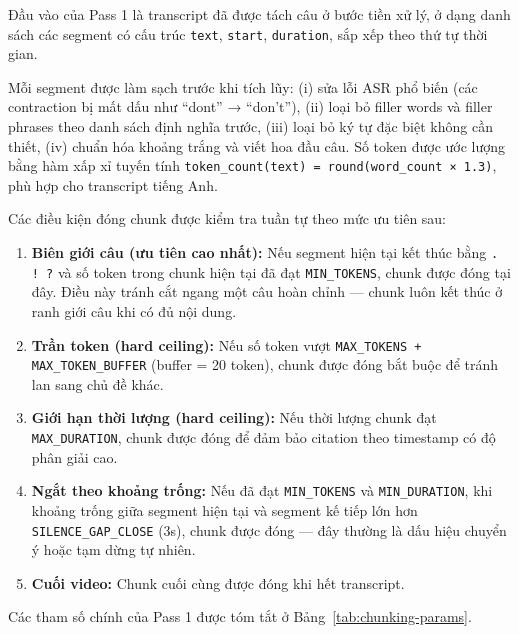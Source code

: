 Đầu vào của Pass 1 là transcript đã được tách câu ở bước tiền xử lý, ở dạng danh sách các segment có cấu trúc \texttt{text}, \texttt{start}, \texttt{duration}, sắp xếp theo thứ tự thời gian.

Mỗi segment được làm sạch trước khi tích lũy: (i) sửa lỗi ASR phổ biến (các contraction bị mất dấu như ``dont'' → ``don't''), (ii) loại bỏ filler words và filler phrases theo danh sách định nghĩa trước, (iii) loại bỏ ký tự đặc biệt không cần thiết, (iv) chuẩn hóa khoảng trắng và viết hoa đầu câu. Số token được ước lượng bằng hàm xấp xỉ tuyến tính \texttt{token\_count(text) = round(word\_count × 1.3)}, phù hợp cho transcript tiếng Anh.

Các điều kiện đóng chunk được kiểm tra tuần tự theo mức ưu tiên sau:

\begin{enumerate}
\item \textbf{Biên giới câu (ưu tiên cao nhất):} Nếu segment hiện tại kết thúc bằng \texttt{. ! ?} và số token trong chunk hiện tại đã đạt \texttt{MIN\_TOKENS}, chunk được đóng tại đây. Điều này tránh cắt ngang một câu hoàn chỉnh — chunk luôn kết thúc ở ranh giới câu khi có đủ nội dung.
\item \textbf{Trần token (hard ceiling):} Nếu số token vượt \texttt{MAX\_TOKENS + MAX\_TOKEN\_BUFFER} (buffer = 20 token), chunk được đóng bắt buộc để tránh lan sang chủ đề khác.
\item \textbf{Giới hạn thời lượng (hard ceiling):} Nếu thời lượng chunk đạt \texttt{MAX\_DURATION}, chunk được đóng để đảm bảo citation theo timestamp có độ phân giải cao.
\item \textbf{Ngắt theo khoảng trống:} Nếu đã đạt \texttt{MIN\_TOKENS} và \texttt{MIN\_DURATION}, khi khoảng trống giữa segment hiện tại và segment kế tiếp lớn hơn \texttt{SILENCE\_GAP\_CLOSE} (3s), chunk được đóng — đây thường là dấu hiệu chuyển ý hoặc tạm dừng tự nhiên.
\item \textbf{Cuối video:} Chunk cuối cùng được đóng khi hết transcript.
\end{enumerate}

Các tham số chính của Pass 1 được tóm tắt ở Bảng~\ref{tab:chunking-params}.

